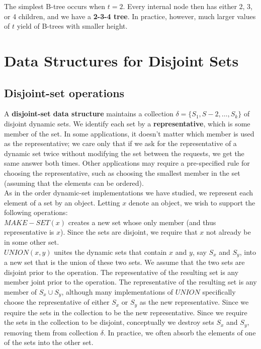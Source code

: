 \documentclass[12pt]{article}
\begin{document}
The simplest B-tree occurs when $t=2$. Every internal node then has either 2, 3, or 4 children, and we have a \textbf{2-3-4 tree}. In practice, however, much larger values of $t$ yield of B-trees with smaller height.

\section{Data Structures for Disjoint Sets}

\subsection{Disjoint-set operations}

A \textbf{disjoint-set data structure} maintains a collection $\delta = \{ S_1, S-2, \dots, S_k \}$ of disjoint dynamic sets. We identify each set by a \textbf{representative}, which is some member of the set. In some applications, it doesn't matter which member is used as the representative; we care only that if we ask for the representative of a dynamic set twice without modifying the set between the requests, we get the same answer both times. Other applications may require a pre-specified rule for choosing the representative, such as choosing the smallest member in the set (assuming that the elements can be ordered). \\

As in the order dynamic-set implementations we have studied, we represent each element of a set by an object. Letting $x$ denote an object, we wish to support the following operations: \\

$MAKE-SET(x)$ creates a new set whose only member (and thus representative is $x$). Since the sets are disjoint, we require that $x$ not already be in some other set. \\

$UNION(x,y)$ unites the dynamic sets that contain $x$ and $y$, say $S_x$ and $S_y$, into a new set that is the union of these two sets. We assume that the two sets are disjoint prior to the operation. The representative of the resulting set is any member joint prior to the operation. The representative of the resulting set is any member of $S_x \cup S_y$, although many implementations of $UNION$ specifically choose the representative of either $S_x$ or $S_y$ as the new representative. Since we require the sets in the collection to be the new representative. Since we require the sets in the collection to be disjoint, conceptually we destroy sets $S_x$ and $S_y$, removing them from collection $\delta$. In practice, we often absorb the elements of one of the sets into the other set. \\
\end{document}
